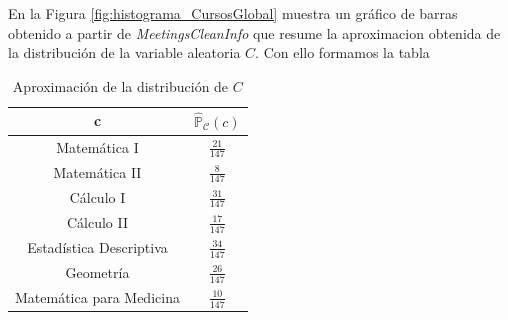 \documentclass[11pt,a4paper]{book}
\theoremstyle{definition}%
\newcommand{\Probsymb}{\mathds{P}}
\begin{document}
            En la Figura \ref{fig:histograma_CursosGlobal} muestra un gráfico de barras obtenido a partir de \textit{MeetingsCleanInfo} que resume la aproximacion obtenida de la distribución de la variable aleatoria $C$. Con ello formamos la tabla
            \begin{table}[H]
                \centering
                \begin{tabular}{|c|c|}
                    \hline
                    c & $\hat{\Probsymb}_{\mathcal{C}}(c)$ \\ \hline
                    Matemática I & $\frac{21}{147}$ \\ \hline
                    Matemática II & $\frac{8}{147}$ \\ \hline
                    Cálculo I & $\frac{31}{147}$ \\ \hline
                    Cálculo II & $\frac{17}{147}$ \\ \hline
                    Estadística Descriptiva & $\frac{34}{147}$ \\ \hline
                    Geometría & $\frac{26}{147}$ \\ \hline
                    Matemática para Medicina & $\frac{10}{147}$ \\ \hline
                \end{tabular}
                \caption{Aproximación de la distribución de $C$}
            \end{table}
\end{document}
